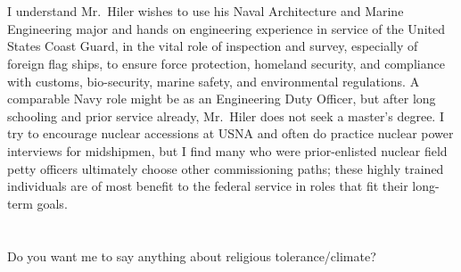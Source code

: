 \documentclass[10pt,courier]{navymemo}
\begin{document}
\section{}
I understand Mr.~Hiler wishes to use his Naval Architecture and Marine Engineering major and hands on engineering experience in service of the United States Coast Guard, in the vital role of inspection and survey, especially of foreign flag ships, to ensure force protection, homeland security, and compliance with customs, bio-security, marine safety, and environmental regulations. A comparable Navy role might be as an Engineering Duty Officer, but after long schooling and prior service already, Mr.~Hiler does not seek a master's degree. I try to encourage nuclear accessions at USNA and often do practice nuclear power interviews for midshipmen, but I find many who were prior-enlisted nuclear field petty officers ultimately choose other commissioning paths; these highly trained individuals are of most benefit to the federal service in roles that fit their long-term goals. 

\section{}
Do you want me to say anything about religious tolerance/climate? 

\noclosing{}
\signature{}
\signature{D EVANGELISTA}
\end{document}
